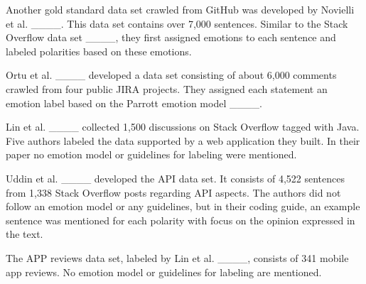 Another gold standard data set crawled from GitHub was developed by Novielli et al. ____. This data set contains over 7,000 sentences. Similar to the Stack Overflow data set ____, they first assigned emotions to each sentence and labeled polarities based on these emotions.

Ortu et al. ____ developed a data set consisting of about 6,000 comments crawled from four public JIRA projects. They assigned each statement an emotion label based on the Parrott emotion model ____.

Lin et al. ____ collected 1,500 discussions on Stack Overflow tagged with Java. Five authors labeled the data supported by a web application they built. In their paper no emotion model or guidelines for labeling were mentioned.

Uddin et al. ____ developed the API data set. It consists of 4,522 sentences from 1,338 Stack Overflow posts regarding API aspects. The authors did not follow an emotion model or any guidelines, but in their coding guide, an example sentence was mentioned for each polarity with focus on the opinion expressed in the text. 

The APP reviews data set, labeled by Lin et al. ____, consists of 341 mobile app reviews. No emotion model or guidelines for labeling are mentioned.